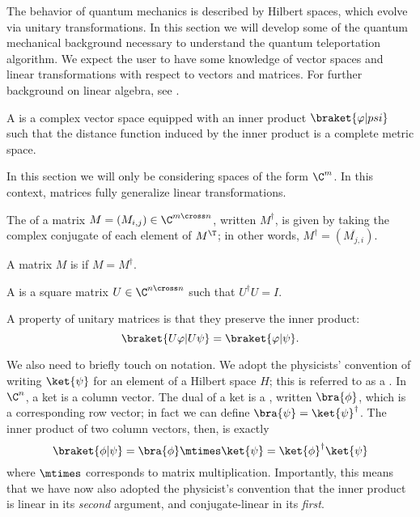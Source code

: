 The behavior of quantum mechanics is described by Hilbert spaces, which
evolve via unitary transformations. In this section we will develop
some of the quantum mechanical background necessary to understand the quantum
teleportation algorithm. We expect the user to have some knowledge of vector spaces and
linear transformations with respect to vectors and matrices. For further
background on linear algebra, see \cite{gallier13}.

\begin{definition}\label{def:hilbert-space}
  A  is a complex vector space equipped with an inner product
  $\braket{\varphi | psi}$
  such that the distance function induced by the inner product is a complete
  metric space.
\end{definition}

In this section we will only be considering spaces of the form $\C^m$.
In this context, matrices fully generalize linear transformations.

\begin{definition}\label{def:conjugate-transpose}
  The  of a matrix $M = (M_{i,j}) \in \C^{m \cross
  n}$, written $M^\dag$, is given by taking the complex conjugate of each
  element of $M^\T$; in other words, $M^\dag = (\overline{M_{j,i}})$.
\end{definition}

\begin{definition}\label{def:hermitian}
  A matrix $M$ is  if $M = M^\dag$.
\end{definition}

\begin{definition}\label{def:unitary-matrix}
  A  is a square matrix $U \in \C^{n \cross n}$ such that
  $U^\dag U = I$. 
\end{definition}
A property of unitary matrices is that they preserve the inner product:
\[
    \braket{U \varphi | U \psi} = \braket{\varphi | \psi}.
\]

We also need to briefly touch on notation.  We adopt the physicists' convention
of writing $\ket{\psi}$ for an element of a Hilbert space $H$; this is referred
to as a . In $\C^n$, a ket is a column vector.
The dual of a ket is a , written $\bra{\phi}$,
which is a corresponding row vector; in fact we can define $\bra{\psi} = \ket{\psi}^\dag$.
The inner product of two column vectors, then, is exactly
\[ \braket{\phi | \psi} = \bra{\phi} \mtimes \ket{\psi} = \ket{\phi}^\dag \ket{\psi} \]
where $\mtimes$ corresponds to matrix multiplication. Importantly, this means that we
have now also adopted the physicist's convention that the inner product is
linear in its \emph{second} argument, and conjugate-linear in its \emph{first}.


